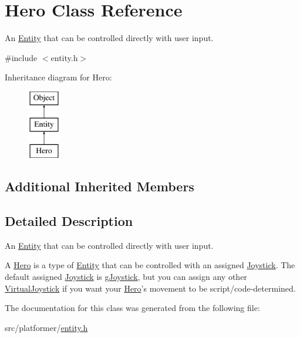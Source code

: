 \hypertarget{class_hero}{\section{Hero Class Reference}
\label{class_hero}
}


An \hyperlink{class_entity}{Entity} that can be controlled directly with user input.  




{\ttfamily \#include $<$entity.\-h$>$}

Inheritance diagram for Hero\-:\begin{figure}[H]
\begin{center}
\leavevmode
\includegraphics[height=3.000000cm]{class_hero}
\end{center}
\end{figure}
\subsection*{Additional Inherited Members}


\subsection{Detailed Description}
An \hyperlink{class_entity}{Entity} that can be controlled directly with user input. 

A \hyperlink{class_hero}{Hero} is a type of \hyperlink{class_entity}{Entity} that can be controlled with an assigned \hyperlink{class_joystick}{Joystick}. The default assigned \hyperlink{class_joystick}{Joystick} is \hyperlink{joystick_8h_af086526cf25607f16a7940bc163126b1}{g\-Joystick}, but you can assign any other \hyperlink{class_virtual_joystick}{Virtual\-Joystick} if you want your \hyperlink{class_hero}{Hero}'s movement to be script/code-\/determined. 

The documentation for this class was generated from the following file\-:\begin{DoxyCompactItemize}
\item 
src/platformer/\hyperlink{entity_8h}{entity.\-h}\end{DoxyCompactItemize}
